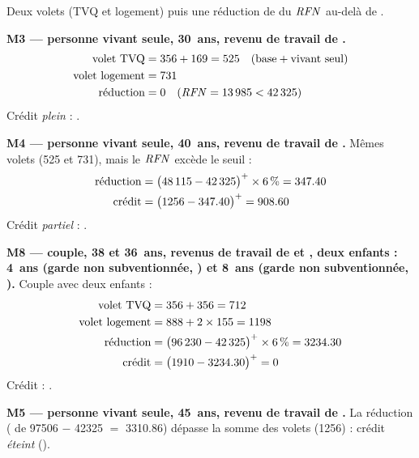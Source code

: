 \pexemples Deux volets (TVQ et logement) puis une réduction de 
du $\mathit{RFN}$ au-delà de .

\medskip\noindent\textbf{M3 --- personne vivant seule, 30~ans, revenu de travail de .}
\begin{align*}
\text{volet TVQ} &= \num{356} + \num{169} = \num{525} \quad (\text{base} + \text{vivant seul}) \\
\text{volet logement} &= \num{731} \\
\text{réduction} &= 0 \quad (\mathit{RFN} = \num{13985} < \num{42325})
\end{align*}
Crédit \emph{plein} : .

\medskip\noindent\textbf{M4 --- personne vivant seule, 40~ans, revenu de travail de .}
Mêmes volets (\num{525} et \num{731}), mais le $\mathit{RFN}$
excède le seuil :
\begin{align*}
\text{réduction} &= \bigl(\num{48115} - \num{42325}\bigr)^{+} \times \num{6}\,\% = \num{347.40} \\
\text{crédit} &= \bigl(\num{1256} - \num{347.40}\bigr)^{+} = \num{908.60}
\end{align*}
Crédit \emph{partiel} : .

\medskip\noindent\textbf{M8 --- couple, 38 et 36~ans, revenus de travail de  et , deux enfants : 4~ans (garde non subventionnée, ) et 8~ans (garde non subventionnée, ).}
Couple avec deux enfants :
\begin{align*}
\text{volet TVQ} &= \num{356} + \num{356} = \num{712} \\
\text{volet logement} &= \num{888} + 2 \times \num{155} = \num{1198} \\
\text{réduction} &= \bigl(\num{96230} - \num{42325}\bigr)^{+} \times \num{6}\,\% = \num{3234.30} \\
\text{crédit} &= \bigl(\num{1910} - \num{3234.30}\bigr)^{+} = \num{0}
\end{align*}
Crédit : .

\medskip\noindent\textbf{M5 --- personne vivant seule, 45~ans, revenu de travail de .}
La réduction ( de \num{97506} $-$
\num{42325} $=$ \num{3310.86}) dépasse la somme des volets
(\num{1256}) : crédit \emph{éteint} ().
